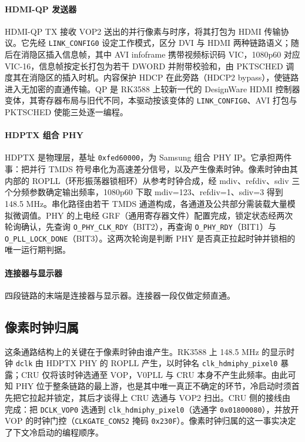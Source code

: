 \paragraph{HDMI-QP 发送器}
HDMI-QP TX 接收 VOP2 送出的并行像素与时序，将其打包为 HDMI 传输协议。它先经 \texttt{LINK\_CONFIG0} 设定工作模式，区分 DVI 与 HDMI 两种链路语义；随后在消隐区插入信息帧，其中 AVI infoframe 携带视频标识码 VIC，1080p60 对应 VIC-16，信息帧按定长打包为若干 DWORD 并附带校验和，由 PKTSCHED 调度其在消隐区的插入时机。内容保护 HDCP 在此旁路（HDCP2 bypass），使链路进入无加密的直通传输。QP 是 RK3588 上较新一代的 DesignWare HDMI 控制器变体，其寄存器布局与旧代不同，本驱动按该变体的 \texttt{LINK\_CONFIG0}、AVI 打包与 PKTSCHED 使能三处逐一编程。

\paragraph{HDPTX 组合 PHY}
HDPTX 是物理层，基址 \texttt{0xfed60000}，为 Samsung 组合 PHY IP。它承担两件事：把并行 TMDS 符号串化为高速差分信号，以及产生像素时钟。像素时钟由其内部的 ROPLL（环形振荡器锁相环）从参考时钟合成，经 mdiv、refdiv、sdiv 三个分频参数确定输出频率，1080p60 下取 mdiv=123、refdiv=1、sdiv=3 得到 148.5 MHz。串化路径由若干 TMDS 通道构成，各通道及公共部分需装载大量模拟微调值。PHY 的上电经 GRF（通用寄存器文件）配置完成，锁定状态经两次轮询确认，先查询 \texttt{O\_PHY\_CLK\_RDY}（BIT2），再查询 \texttt{O\_PHY\_RDY}（BIT1）与 \texttt{O\_PLL\_LOCK\_DONE}（BIT3）。这两次轮询是判断 PHY 是否真正拉起时钟并锁相的唯一运行期判据。

\paragraph{连接器与显示器}
四段链路的末端是连接器与显示器。连接器一段仅做定频直通。

\subsection{像素时钟归属}

这条通路结构上的关键在于像素时钟由谁产生。RK3588 上 148.5 MHz 的显示时钟 \texttt{dclk} 由 HDPTX PHY 的 ROPLL 产生，以时钟名 \texttt{clk\_hdmiphy\_pixel0} 暴露；CRU 仅将该时钟选通至 VOP，V0PLL 与 CRU 本身不产生此频率。由此可知 PHY 位于整条链路的最上游，也是其中唯一真正不确定的环节，冷启动时须首先把它拉起并锁定，其后才谈得上 CRU 选通与 VOP2 扫出。CRU 侧的接线由 完成：把 \texttt{DCLK\_VOP0} 选通到 \texttt{clk\_hdmiphy\_pixel0}（选通字 \texttt{0x01800080}），并放开 VOP 的时钟门控（\texttt{CLKGATE\_CON52} 掩码 \texttt{0x230F}）。像素时钟归属的这一事实决定了下文冷启动的编程顺序。

